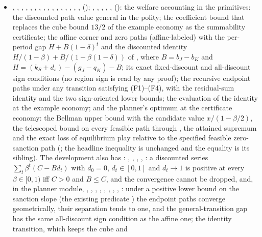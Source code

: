 \begin{itemize}[leftmargin=1.4em,itemsep=1pt]
\item {}, , , , , , , , , , , , , , , ,  (); , , , , ,  (): the welfare accounting in the primitives: the discounted path value general in the polity; the coefficient bound that replaces the cube bound $13/2$ of the example economy as the summability certificate; the affine corner and zero paths (affine-labeled) with the per-period gap $H+B(1-\delta)^t$ and the discounted identity $H/(1-\beta)+B/(1-\beta(1-\delta))$ of , where $B=b_J-b_K$ and $H=(k_S+d_s)-(g_J-q_K)-B$; its exact fixed-discount and all-discount sign conditions (no region sign is read by any proof); the recursive endpoint paths under any transition satisfying (F1)--(F4), with the residual-sum identity and the two sign-oriented lower bounds; the evaluation of the identity at the example economy; and the planner's optimum at the certificate economy: the Bellman upper bound with the candidate value $x/(1-\beta/2)$, the telescoped bound on every feasible path through , the attained supremum and the exact loss of equilibrium play relative to the specified feasible zero-sanction path (; the headline inequality  is unchanged and the equality is its sibling). The development also has : , , , , : a discounted series $\sum_t\beta^t(C-Bd_t)$ with $d_0=0$, $d_t\in[0,1]$ and $d_t\to1$ is positive at every $\beta\in[0,1)$ iff $C>0$ and $B\le C$, and the convergence cannot be dropped, and, in the planner module, , , , , , , , , : under a positive lower bound on the sanction slope (the existing predicate ) the endpoint paths converge geometrically, their separation tends to one, and the general-transition gap has the same all-discount sign condition as the affine one; the identity transition, which keeps the cube and 
\end{itemize}
